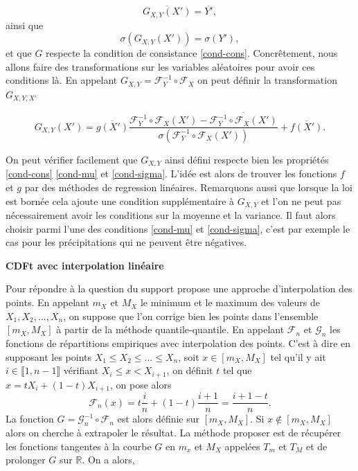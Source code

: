 \documentclass[a4paper,11pt]{article}
\numberwithin{equation}{section}
\begin{document}
\begin{equation}
	\label{cond-mu}
	\overline{G_{X,Y}(X')}=\overline{Y'},
\end{equation}
ainsi que
\begin{equation}
	\label{cond-sigma}
	\sigma({G_{X,Y}(X')})=\sigma(Y'),
\end{equation}
et que $G$ respecte la condition de consistance \eqref{cond-cons}.
Concrêtement, nous allons faire des transformations sur les variables aléatoires pour avoir ces conditions là. En appelant $G_{X,Y}= \mathcal{F}^{-1}_{Y}\circ\mathcal{F}_{X}$ on peut définir la transformation $G_{X,Y,X'}$

\[ G_{X,Y} (X')= \overline{g(X')}\frac{\mathcal{F}^{-1}_{Y}\circ\mathcal{F}_{X}(X')- \overline{\mathcal{F}^{-1}_{Y}\circ\mathcal{F}_{X}(X')}}{\sigma(\mathcal{F}^{-1}_{Y}\circ\mathcal{F}_{X}(X'))} + \overline{f(X')}.\]

On peut vérifier facilement que $G_{X,Y}$ ainsi défini respecte bien les propriétés \eqref{cond-cons} \eqref{cond-mu} et \eqref{cond-sigma}. L'idée est alors de trouver les fonctions $f$ et $g$ par des méthodes de regression linéaires. Remarquons aussi que lorsque la loi est bornée cela ajoute une condition supplémentaire à $G_{X,Y}$ et l'on ne peut pas nécessairement avoir les conditions sur la moyenne et la variance. Il faut alors choisir parmi l'une des conditions \eqref{cond-mu} et \eqref{cond-sigma}, c'est par exemple le cas pour les précipitations qui ne peuvent être négatives. 

\vspace{0.7cm}

\noindent \textbf{CDFt avec interpolation linéaire \cite{michelangeli2009probabilistic}}

Pour répondre à la question du support \cite{michelangeli2009probabilistic} propose une approche d'interpolation des points. En appelant $m_X$ et $M_X$ le minimum et le maximum des valeurs de $X_1, X_2,...,X_n$, on suppose que l'on corrige bien les points dans l'ensemble $[m_X,M_X]$ à partir de la méthode quantile-quantile. En appelant $\mathcal{F}_n$ et $\mathcal{G}_n$ les fonctions de répartitions empiriques avec interpolation des points. C'est à dire en supposant les points $X_1\leq X_2\leq ...\leq X_n$, soit $x \in [m_X,M_X]$ tel qu'il y ait $i \in \llbracket 1, n-1 \rrbracket$ vérifiant $X_i\leq x < X_{i+1}$, on définit $t$ tel que $x= t X_i+(1-t)X_{i+1}$, on pose alors
\[\mathcal{F}_n(x)= t\frac{i}{n} + (1-t)\frac{i+1}{n}= \frac{i+1-t}{n}.\]
La fonction $G=\mathcal{G}_n^{-1}\circ \mathcal{F}_n$ est alors définie sur $[m_X,M_X]$. Si $x \notin [m_X,M_X]$ alors on cherche à extrapoler le résultat. La méthode proposer est de récupérer les fonctions tangentes à la courbe $G$ en $m_x$ et $M_X$ appelées $T_m$ et $T_M$ et de prolonger $G$ sur $\mathbb{R}$. On a alors,
\end{document}
